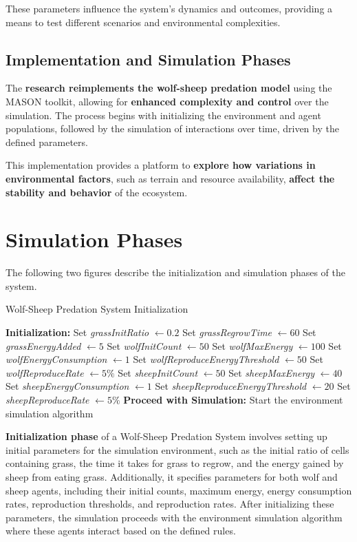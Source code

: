\documentclass[12pt,a4paper]{article}
\begin{document}
These parameters influence the system's dynamics and outcomes, providing a means to test different scenarios and environmental complexities.

\subsection{Implementation and Simulation Phases}

The \textbf{research reimplements the wolf-sheep predation model} using the MASON toolkit, allowing for \textbf{enhanced complexity and control} over the simulation. The process begins with initializing the environment and agent populations, followed by the simulation of interactions over time, driven by the defined parameters.

This implementation provides a platform to \textbf{explore how variations in environmental factors}, such as terrain and resource availability, \textbf{affect the stability and behavior} of the ecosystem.

\section{Simulation Phases}

The following two figures describe the initialization and simulation phases of the system.

\begin{algorithm}
\caption{Wolf-Sheep Predation System Initialization}\label{alg:wolf-sheep}
\begin{algorithmic}[1]
\State \textbf{Initialization:}
\State Set \textit{grassInitRatio} $\leftarrow 0.2$
\State Set \textit{grassRegrowTime} $\leftarrow 60$
\State Set \textit{grassEnergyAdded} $\leftarrow 5$
\State Set \textit{wolfInitCount} $\leftarrow 50$
\State Set \textit{wolfMaxEnergy} $\leftarrow 100$
\State Set \textit{wolfEnergyConsumption} $\leftarrow 1$
\State Set \textit{wolfReproduceEnergyThreshold} $\leftarrow 50$
\State Set \textit{wolfReproduceRate} $\leftarrow 5\%$
\State Set \textit{sheepInitCount} $\leftarrow 50$
\State Set \textit{sheepMaxEnergy} $\leftarrow 40$
\State Set \textit{sheepEnergyConsumption} $\leftarrow 1$
\State Set \textit{sheepReproduceEnergyThreshold} $\leftarrow 20$
\State Set \textit{sheepReproduceRate} $\leftarrow 5\%$
\State \textbf{Proceed with Simulation:} Start the environment simulation algorithm
\end{algorithmic}
\end{algorithm}
\textbf{Initialization phase} of a Wolf-Sheep Predation System involves setting up initial parameters for the simulation environment, such as the initial ratio of cells containing grass, the time it takes for grass to regrow, and the energy gained by sheep from eating grass. Additionally, it specifies parameters for both wolf and sheep agents, including their initial counts, maximum energy, energy consumption rates, reproduction thresholds, and reproduction rates. After initializing these parameters, the simulation proceeds with the environment simulation algorithm where these agents interact based on the defined rules.
\end{document}
